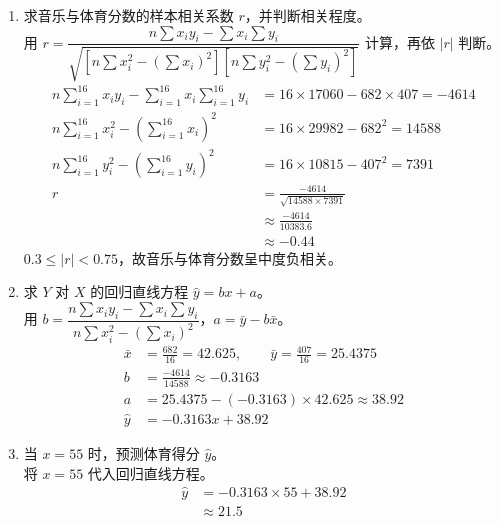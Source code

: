 \documentclass[12pt,a4paper]{exam-zh}
\begin{document}
\begin{solution}
    \begin{enumerate}[label=(\alph*)]
        \item 求音乐与体育分数的样本相关系数 $r$，并判断相关程度。\\
        用 $r=\dfrac{n\sum x_iy_i-\sum x_i\sum y_i}{\sqrt{\left[n\sum x_i^2-\left(\sum x_i\right)^2\right]\left[n\sum y_i^2-\left(\sum y_i\right)^2\right]}}$ 计算，再依 $|r|$ 判断。
        \begin{align*}
            n\sum\limits_{i=1}^{16}x_iy_i-\sum\limits_{i=1}^{16}x_i\sum\limits_{i=1}^{16}y_i &= 16\times 17060-682\times 407=-4614 \\
            n\sum\limits_{i=1}^{16}x_i^2-\left(\sum\limits_{i=1}^{16}x_i\right)^2 &= 16\times 29982-682^2=14588 \\
            n\sum\limits_{i=1}^{16}y_i^2-\left(\sum\limits_{i=1}^{16}y_i\right)^2 &= 16\times 10815-407^2=7391 \\
            r &= \frac{-4614}{\sqrt{14588\times 7391}} \\
            &\approx \frac{-4614}{10383.6} \\
            &\approx -0.44
        \end{align*}
        $0.3\le|r|<0.75$，故音乐与体育分数呈中度负相关。

        \item 求 $Y$ 对 $X$ 的回归直线方程 $\hat{y}=bx+a$。\\
        用 $b=\dfrac{n\sum x_iy_i-\sum x_i\sum y_i}{n\sum x_i^2-\left(\sum x_i\right)^2}$，$a=\bar{y}-b\bar{x}$。
        \begin{align*}
            \bar{x} &= \frac{682}{16}=42.625, \qquad \bar{y}=\frac{407}{16}=25.4375 \\
            b &= \frac{-4614}{14588}\approx -0.3163 \\
            a &= 25.4375-(-0.3163)\times 42.625\approx 38.92 \\
            \hat{y} &= -0.3163x+38.92
        \end{align*}

        \item 当 $x=55$ 时，预测体育得分 $\hat{y}$。\\
        将 $x=55$ 代入回归直线方程。
        \begin{align*}
            \hat{y} &= -0.3163\times 55+38.92 \\
            &\approx 21.5
        \end{align*}
    \end{enumerate}
\end{solution}
\end{document}
